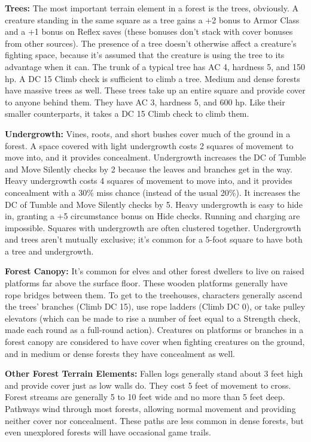 \documentclass{article}
\begin{document}
\textbf{Trees: }The most important terrain element in a forest is the trees, obviously. 
A creature standing in the same square as a tree gains a +2 bonus to Armor Class 
and a +1 bonus on Reflex saves (these bonuses don't stack with cover bonuses from 
other sources). The presence of a tree doesn't otherwise affect a creature's fighting 
space, because it's assumed that the creature is using the tree to its advantage 
when it can. The trunk of a typical tree has AC 4, hardness 5, and 150 hp. A DC 
15 Climb check is sufficient to climb a tree. Medium and dense forests have massive 
trees as well. These trees take up an entire square and provide cover to anyone 
behind them. They have AC 3, hardness 5, and 600 hp. Like their smaller counterparts, 
it takes a DC 15 Climb check to climb them.

\textbf{Undergrowth:} Vines, roots, and short bushes cover much of the ground in 
a forest. A space covered with light undergrowth costs 2 squares of movement to 
move into, and it provides concealment. Undergrowth increases the DC of Tumble 
and Move Silently checks by 2 because the leaves and branches get in the way. Heavy 
undergrowth costs 4 squares of movement to move into, and it provides concealment 
with a 30\% miss chance (instead of the usual 20\%). It increases the DC of Tumble 
and Move Silently checks by 5. Heavy undergrowth is easy to hide in, granting a 
+5 circumstance bonus on Hide checks. Running and charging are impossible. Squares 
with undergrowth are often clustered together. Undergrowth and trees aren't mutually 
exclusive; it's common for a 5-foot square to have both a tree and undergrowth.

\textbf{Forest Canopy:} It's common for elves and other forest dwellers to live 
on raised platforms far above the surface floor. These wooden platforms generally 
have rope bridges between them. To get to the treehouses, characters generally 
ascend the trees' branches (Climb DC 15), use rope ladders (Climb DC 0), or take 
pulley elevators (which can be made to rise a number of feet equal to a Strength 
check, made each round as a full-round action). Creatures on platforms or branches 
in a forest canopy are considered to have cover when fighting creatures on the 
ground, and in medium or dense forests they have concealment as well.

\textbf{Other Forest Terrain Elements: }Fallen logs generally stand about 3 feet 
high and provide cover just as low walls do. They cost 5 feet of movement to cross. 
Forest streams are generally 5 to 10 feet wide and no more than 5 feet deep. Pathways 
wind through most forests, allowing normal movement and providing neither cover 
nor concealment. These paths are less common in dense forests, but even unexplored 
forests will have occasional game trails.
\end{document}
